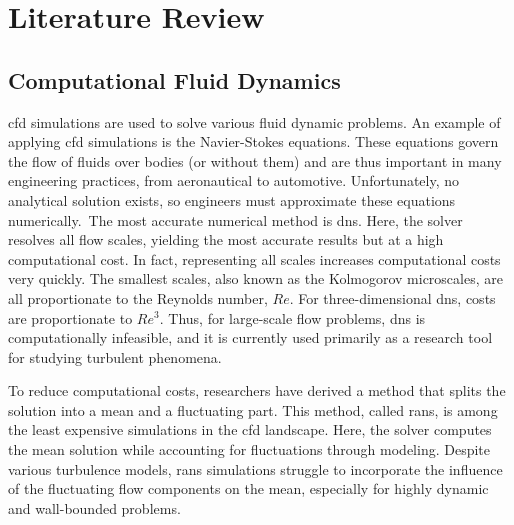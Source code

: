 
\chapter{Literature Review} \label{ch:literature}

\section{Computational Fluid Dynamics} \label{sec:cfd}


\gls{cfd} simulations are used to solve various fluid dynamic problems.
An example of applying \gls{cfd} simulations is the Navier-Stokes equations.
These equations govern the flow of fluids over bodies (or without them) and are thus important in many engineering practices, from aeronautical to automotive.
Unfortunately, no analytical solution exists, so engineers must approximate these equations numerically.\ The most accurate numerical method is \gls{dns}.
Here, the solver resolves all flow scales, yielding the most accurate results but at a high computational cost.
In fact, representing all scales increases computational costs very quickly.
The smallest scales, also known as the Kolmogorov microscales, are all proportionate to the Reynolds number, $Re$.
For three-dimensional \gls{dns}, costs are proportionate to $Re^3$.
Thus, for large-scale flow problems, \gls{dns} is computationally infeasible, and it is currently used primarily as a research tool for studying turbulent phenomena.

To reduce computational costs, researchers have derived a method that splits the solution into a mean and a fluctuating part.
This method, called \gls{rans}, is among the least expensive simulations in the \gls{cfd} landscape.
Here, the solver computes the mean solution while accounting for fluctuations through modeling.
Despite various turbulence models, \gls{rans} simulations struggle to incorporate the influence of the fluctuating flow components on the mean, especially for highly dynamic and wall-bounded problems.

